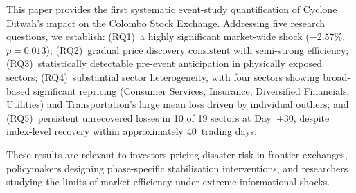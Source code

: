 \documentclass[sigconf, nonacm]{acmart}
\begin{document}
This paper provides the first systematic event-study quantification of
Cyclone Ditwah's impact on the Colombo Stock Exchange. Addressing five
research questions, we establish: (RQ1)~a highly significant market-wide
shock ($-2.57\%$, $p=0.013$); (RQ2)~gradual price discovery consistent
with semi-strong efficiency; (RQ3)~statistically detectable pre-event
anticipation in physically exposed sectors; (RQ4)~substantial sector
heterogeneity, with four sectors showing broad-based significant repricing
(Consumer Services, Insurance, Diversified Financials, Utilities) and
Transportation's large mean loss driven by individual outliers; and
(RQ5)~persistent unrecovered losses in 10 of 19 sectors at Day~$+30$,
despite index-level recovery within approximately 40~trading days.

These results are relevant to investors pricing disaster risk in frontier
exchanges, policymakers designing phase-specific stabilisation interventions,
and researchers studying the limits of market efficiency under extreme
informational shocks.
\end{document}
